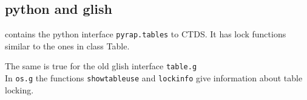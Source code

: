 \subsection{python and glish}
contains the python interface \texttt{pyrap.tables} to CTDS.
It has lock functions similar to the ones in class Table.

The same is true for the old glish interface \texttt{table.g}
\\In \texttt{os.g} the functions \texttt{showtableuse} and
\texttt{lockinfo} give information about table locking.

